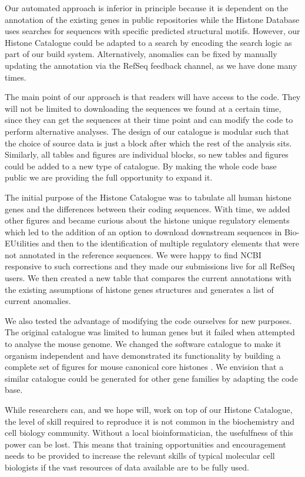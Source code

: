 Our automated
approach is inferior in principle because it is dependent on the
annotation of the existing genes in public repositories
while the Histone Database uses searches for
sequences with specific predicted structural motifs.  However, our
Histone Catalogue could be adapted to a search by
encoding the search logic as part of our build system.
Alternatively, anomalies can be fixed by manually updating the
annotation via the RefSeq feedback channel, as we have done many times.

The main point of our approach is that readers will have access to the
code.  They will not be limited to downloading the sequences we found
at a certain time, since
they can get the sequences at their time point and can modify the
code to perform alternative analyses.
The design of our catalogue is
modular such that the choice of source data is just a block after
which the rest of the
analysis sits.  Similarly, all tables and figures are individual
blocks, so new tables and figures could be added to a new type of catalogue.
By making the whole code base public we are providing the full opportunity
to expand it.

The initial purpose of the Histone Catalogue
was to tabulate all human histone genes and the differences between
their coding sequences.  With time, we added other figures and became
curious about the histone unique regulatory elements which
led to the addition of an option to download downstream sequences in
Bio-EUtilities and then to the identification of multiple regulatory
elements that were not annotated in the reference sequences.  We were
happy to find NCBI responsive to such corrections and they made
our submissions live for all RefSeq users.
We then created a new table  that compares
the current annotations with the existing assumptions of histone genes
structures and generates a list of current anomalies.

We also tested the advantage of modifying the code ourselves for new
purposes.  The original catalogue was limited to human genes but it
failed when attempted to analyse the mouse genome.  We changed
the software catalogue to make it organism independent and have
demonstrated its functionality by building a complete set of figures
for mouse canonical core histones
.  We envision that a similar catalogue
could be generated for other gene families by adapting the code base.

While researchers can, and we hope will, work on top of our
Histone Catalogue, the level of skill required to reproduce it is not
common in the biochemistry and cell biology community.
Without a local bioinformatician, the
usefulfness of this power can be lost.  This means that training
opportunities and encouragement needs to be provided to increase the
relevant skills of typical molecular cell biologists if the vast
resources of data available are to be fully used.

